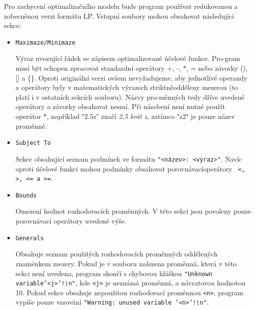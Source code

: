 \documentclass[
12pt,
a4paper,
pdftex,
czech,
titlepage
]{report}
\begin{document}
Pro zachycení optimalizačního modelu bude program používat redukovanou a
zobecněnou verzi formátu LP. Vstupní soubory
mohou obsahovat následující sekce:

\begin{itemize}[label={}]
\item \texttt{Maximaze/Minimaze}
\hspace{1cm} \begin{minipage}[t]{0.56\textwidth}  Výraz uvozující řádek se zápisem optimalizované
účelové funkce. Pro-gram musí být schopen zpracovat standardní operátory
+, -, *, = nebo závorky (), {[}{]} a \{\}. Oproti originální verzi ovšem
nevyžadujeme, aby jednotlivé operandy a operátory byly v matematických
výrazech striktněodděleny mezerou (to platí i v ostatních sekcích
souboru). Názvy pro-měnných tedy dříve uvedené operátory a závorky
obsahovat nesmí. Při násobení není nutné použít operátor *, například
"2.5z" značí \textit{2,5 krát \emph{z}}, zatímco "z2" je pouze název proměnné.
\end{minipage}

\item \texttt{Subject To}
\hspace{2.6cm} \begin{minipage}[t]{0.56\textwidth} Sekce obsahující seznam podmínek ve formátu
\texttt{"\textless název\textgreater: \textless výraz\textgreater"}. Navíc oproti
účelové funkci mohou podmínky obsahovat porovnávacíoperátory \texttt{ \textless,
\textgreater, \textless= a \textgreater=}.
\end{minipage}

\item \texttt{Bounds}
\hspace{3.4cm} \begin{minipage}[t]{0.56\textwidth} Omezení hodnot rozhodovacích proměnných. V této sekci jsou
povoleny pouze porovnávací operátory uvedené výše.
\end{minipage}

\item \texttt{Generals}
\hspace{3cm} \begin{minipage}[t]{0.56\textwidth}   Obsahuje seznam použitých rozhodovacích proměnných oddělených
znaménkem mezery. Pokud je v souboru nalezena proměnná, která v této sekci
není uvedena, program skončí s chybovou hláškou \texttt{"Unknown
variable'\textless j\textgreater'!\emph{\textbackslash{}}n"}, kde
\texttt{\textless j\textgreater{}} je neznámá proměnná, a návratovou hodnotou 10.
Pokud sekce obsahuje nepoužitou rozhodovací proměnnou
\texttt{\textless n\textgreater}, program vypíše pouze varování \texttt{"Warning: unused
variable '\textless n\textgreater'!\emph{\textbackslash{}}n"}.
\end{minipage}



\end{itemize}
\end{document}
